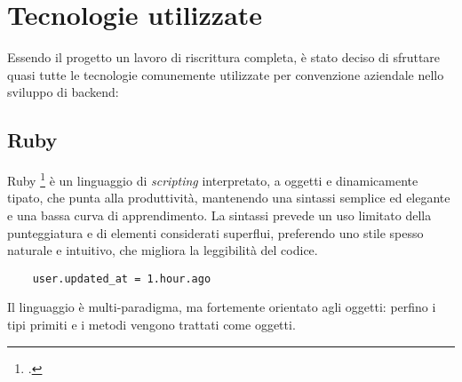 \section{Tecnologie utilizzate}
Essendo il progetto un lavoro di riscrittura completa, è stato deciso di sfruttare quasi tutte le tecnologie comunemente utilizzate per convenzione aziendale nello sviluppo di backend:

\subsection{Ruby}
Ruby \footcite{site:ruby} è un linguaggio di \emph{scripting} interpretato, a oggetti e dinamicamente tipato, che punta alla produttività, mantenendo una sintassi semplice ed elegante e una bassa curva di apprendimento. La sintassi prevede un uso limitato della punteggiatura e di elementi considerati superflui, preferendo uno stile spesso naturale e intuitivo, che migliora la leggibilità del codice.
\begin{lstlisting}
	user.updated_at = 1.hour.ago
\end{lstlisting}
Il linguaggio è multi-paradigma, ma fortemente orientato agli oggetti: perfino i tipi primiti e i metodi vengono trattati come oggetti. 
